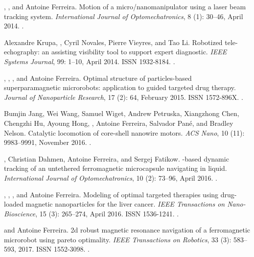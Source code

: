 \begin{Mybibliography}{99}
  \NAmari, \DavidFolio, and Antoine Ferreira.
  \newblock Motion of a micro/nanomanipulator using a laser beam tracking system.
  \newblock \emph{International Journal of Optomechatronics}, 8
  (1): 30--46, April 2014{}.
  \newblock {}.
    
  Alexandre Krupa, \DavidFolio, Cyril Novales, Pierre Vieyres, and Tao Li.
  \newblock Robotized tele-echography: an assisting visibility tool to support
  expert diagnostic.
  \newblock \emph{IEEE Systems Journal}, 99: 1--10, April 2014.
  \newblock ISSN 1932-8184.
  \newblock {}.
    
  \LMellal, \KBelharet, \DavidFolio, and Antoine Ferreira.
  \newblock Optimal structure of particles-based superparamagnetic microrobots:
  application to \MRI guided targeted drug therapy.
  \newblock \emph{Journal of Nanoparticle Research}, 17 (2):
  64, February 2015{}.
  \newblock ISSN 1572-896X.
  \newblock {}.

  Bumjin Jang, Wei Wang, Samuel Wiget, Andrew Petruska, Xiangzhong Chen, Chengzhi
  Hu, Ayoung Hong, \DavidFolio, Antoine Ferreira, Salvador Pané, and Bradley
  Nelson.
  \newblock Catalytic locomotion of core-shell nanowire motors.
  \newblock \emph{ACS Nano}, 10 (11): 9983--9991, November
  2016.
  \newblock {}.

  \DavidFolio, Christian Dahmen, Antoine Ferreira, and Sergej Fatikow.
  \newblock \MRI-based dynamic tracking of an untethered ferromagnetic
  microcapsule navigating in liquid.
  \newblock \emph{International Journal of Optomechatronics}, 10
  (2): 73--96, April 2016.
  \newblock {}.
  
  \LMellal, \DavidFolio, \KBelharet, and Antoine Ferreira.
  \newblock Modeling of optimal targeted therapies using drug-loaded magnetic
  nanoparticles for the liver cancer.
  \newblock \emph{IEEE Transactions on Nano-Bioscience}, 15
  (3): 265--274, April 2016{}.
  \newblock ISSN 1536-1241.
  \newblock {}.
  
  \DavidFolio and Antoine Ferreira.
  \newblock 2d robust magnetic resonance navigation of a ferromagnetic microrobot
  using pareto optimality.
  \newblock \emph{{IEEE} Transactions on Robotics}, 33 (3):
  583--593, 2017.
  \newblock ISSN 1552-3098.
  \newblock {}.

  
\end{Mybibliography}



